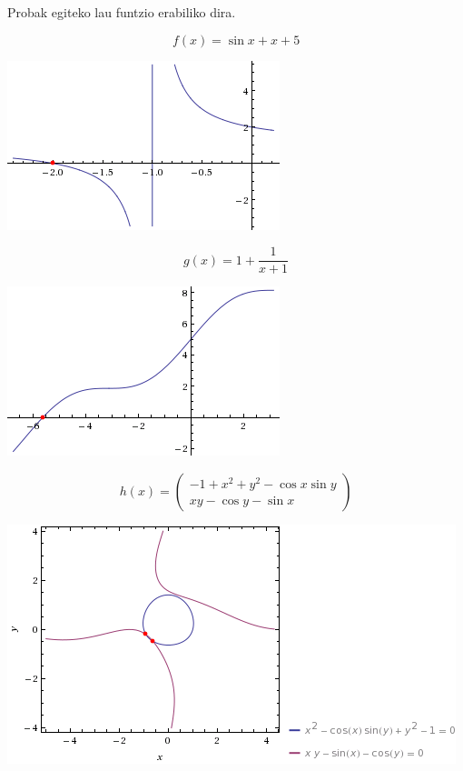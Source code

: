 \documentclass[10pt,a4paper,basque]{article}
\begin{document}
Probak egiteko lau funtzio erabiliko dira.

$$f(x) = \sin{x} + x + 5$$

\begin{center}
\includegraphics[scale=0.5]{plot_fx.png}
\end{center}

$$g(x) = 1 + \frac{1}{x + 1}$$

\begin{center}
\includegraphics[scale=0.5]{plot_gx.png}
\end{center}

$$h(x) = \left(
\begin{array}{c}
-1 + x^2 + y^2 - \cos{x}\sin{y}\\
xy - \cos{y} - \sin{x}
\end{array}
\right)$$

\begin{center}
\includegraphics[scale=0.5]{plot_hx.png}
\end{center}
\end{document}
